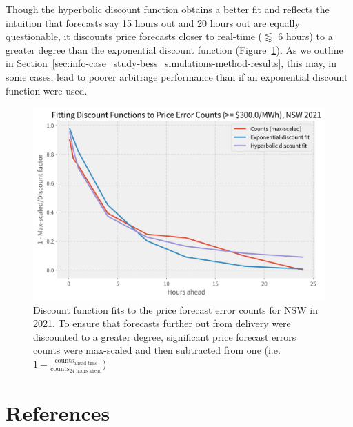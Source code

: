 \documentclass[12pt,a4paper,]{report}
\begin{document}
Though the hyperbolic discount function obtains a better fit and
reflects the intuition that forecasts say 15 hours out and 20 hours out
are equally questionable, it discounts price forecasts closer to
real-time (\(\lessapprox\) 6 hours) to a greater degree than the
exponential discount function
(Figure~\ref{fig:discount_function_fitting}). As we outline in
Section~\ref{sec:info-case_study-bess_simulations-method-results}, this
may, in some cases, lead to poorer arbitrage performance than if an
exponential discount function were used.

\begin{figure}
\hypertarget{fig:discount_function_fitting}{%
\centering
\includegraphics{source/figures/curve_fits_300.0.png}
\caption[Price forecast error counts for NSW in 2021, and the fitted
exponential and hyperbolic discount functions]{Discount function fits to
the price forecast error counts for NSW in 2021. To ensure that
forecasts further out from delivery were discounted to a greater degree,
significant price forecast errors counts were max-scaled and then
subtracted from one
(i.e.~\(1-\frac{\textrm{counts}_{\textrm{ahead time}}}{\textrm{counts}_{\textrm{24 hours ahead}}}\))}\label{fig:discount_function_fitting}
}
\end{figure}

\footnotesize
\singlespacing
\setlength{\parindent}{0in}

\hypertarget{references}{%
\chapter*{References}\label{references}}
\end{document}
